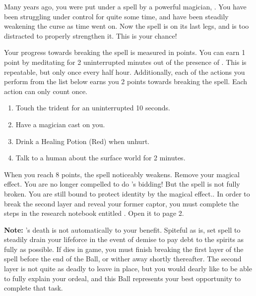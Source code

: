 \documentclass[green]{NeptuneBall}
\begin{document}
\name{\gSpellBreak{}}


Many years ago, you were put under a spell by a powerful magician, \cWitch{}. You have been struggling under \cWitch{\their} control for quite some time, and have been steadily weakening the curse as time went on. Now the spell is on its last legs, and \cWitch{} is too distracted to properly strengthen it. This is your chance!

Your progress towards breaking the spell is measured in points. You can earn 1 point by meditating for 2 uninterrupted minutes out of the presence of \cWitch{}. This is repeatable, but only once every half hour. Additionally, each of the actions you perform from the list below earns you 2 points towards breaking the spell. Each action can only count once.

\begin{enumerate}
\item Touch the trident for an uninterrupted 10 seconds.
\item Have a magician cast \aLesserDispel{} on you.
\item Drink a Healing Potion (Red) when unhurt.
\item Talk to a human about the surface world for 2 minutes.
\end{enumerate}

When you reach 8 points, the spell noticeably weakens. Remove your \iEnslavementSpell{} magical effect. You are no longer compelled to do \cWitch{}'s bidding! But the spell is not fully broken. You are still bound to protect \cWitch{\their} identity by the \iIdentityProtectionSpell{} magical effect.. In order to break the second layer and reveal your former captor, you must complete the steps in the research notebook entitled \nSpellBreakNotebook{}. Open it to page 2.

{\bf Note:} \cWitch{}'s death is not automatically to your benefit. Spiteful as \cWitch{\they} is, \cWitch{} set \cWitch{\their} spell to steadily drain your lifeforce in the event of \cWitch{\their} demise to pay \cWitch{\their} debt to the spirits as fully as possible. If \cWitch{} dies in game, you must finish breaking the first layer of the spell before the end of the Ball, or wither away shortly thereafter. The second layer is not quite as deadly to leave in place, but you would dearly like to be able to fully explain your ordeal, and this Ball represents your best opportunity to complete that task.
\end{document}
